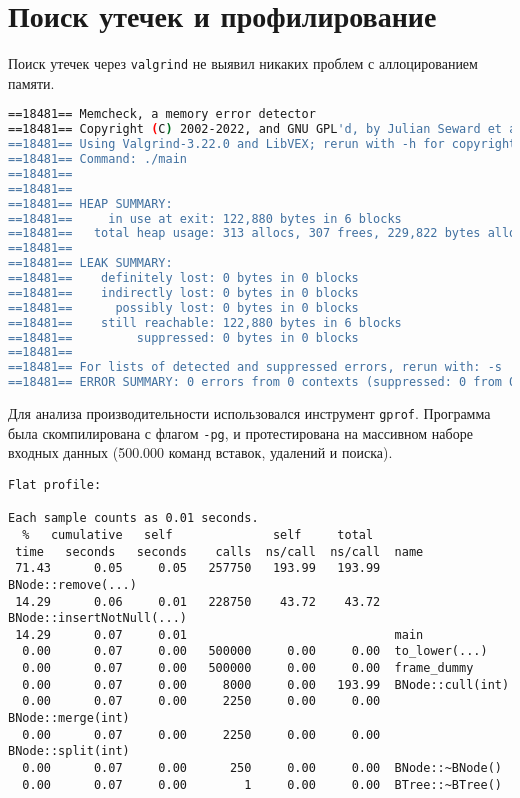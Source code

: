 \section*{Поиск утечек и профилирование}
Поиск утечек через \texttt{valgrind} не выявил никаких проблем с аллоцированием памяти.
\begin{lstlisting}[language=bash, caption=Вывод valgrind]
==18481== Memcheck, a memory error detector
==18481== Copyright (C) 2002-2022, and GNU GPL'd, by Julian Seward et al.
==18481== Using Valgrind-3.22.0 and LibVEX; rerun with -h for copyright info
==18481== Command: ./main
==18481== 
==18481== 
==18481== HEAP SUMMARY:
==18481==     in use at exit: 122,880 bytes in 6 blocks
==18481==   total heap usage: 313 allocs, 307 frees, 229,822 bytes allocated
==18481==  
==18481== LEAK SUMMARY:
==18481==    definitely lost: 0 bytes in 0 blocks
==18481==    indirectly lost: 0 bytes in 0 blocks
==18481==      possibly lost: 0 bytes in 0 blocks
==18481==    still reachable: 122,880 bytes in 6 blocks
==18481==         suppressed: 0 bytes in 0 blocks
==18481== 
==18481== For lists of detected and suppressed errors, rerun with: -s
==18481== ERROR SUMMARY: 0 errors from 0 contexts (suppressed: 0 from 0)
\end{lstlisting}

Для анализа производительности использовался инструмент \texttt{gprof}. Программа была скомпилирована с флагом \texttt{-pg}, и протестирована на массивном наборе входных данных (500.000 команд вставок, удалений и поиска).

\begin{lstlisting}[caption=Flat profile]
Flat profile:

Each sample counts as 0.01 seconds.
  %   cumulative   self              self     total           
 time   seconds   seconds    calls  ns/call  ns/call  name    
 71.43      0.05     0.05   257750   193.99   193.99  BNode::remove(...)
 14.29      0.06     0.01   228750    43.72    43.72  BNode::insertNotNull(...)
 14.29      0.07     0.01                             main
  0.00      0.07     0.00   500000     0.00     0.00  to_lower(...)
  0.00      0.07     0.00   500000     0.00     0.00  frame_dummy
  0.00      0.07     0.00     8000     0.00   193.99  BNode::cull(int)
  0.00      0.07     0.00     2250     0.00     0.00  BNode::merge(int)
  0.00      0.07     0.00     2250     0.00     0.00  BNode::split(int)
  0.00      0.07     0.00      250     0.00     0.00  BNode::~BNode()
  0.00      0.07     0.00        1     0.00     0.00  BTree::~BTree()
\end{lstlisting}

